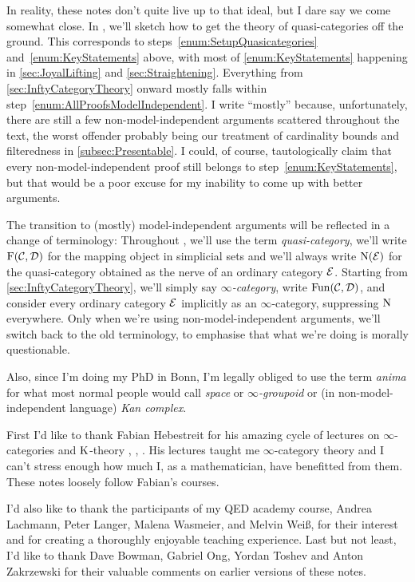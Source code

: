 \documentclass[DIV=12,numbers=enddot,leqno,bibliography=totoc]{scrartcl}
\begin{document}
\begin{numpar}
		In reality, these notes don't quite live up to that ideal, but I dare say we come somewhat close. In , we'll sketch how to get the theory of quasi-categories off the ground. This corresponds to steps~\cref{enum:SetupQuasicategories} and~\cref{enum:KeyStatements} above, with most of \cref{enum:KeyStatements} happening in \cref{sec:JoyalLifting} and \cref{sec:Straightening}. Everything from \cref{sec:InftyCategoryTheory} onward mostly falls within step~\cref{enum:AllProofsModelIndependent}. I write \enquote{mostly} because, unfortunately, there are still a few non-model-independent arguments scattered throughout the text, the worst offender probably being our treatment of cardinality bounds and filteredness in \cref{subsec:Presentable}. I could, of course, tautologically claim that every non-model-independent proof still belongs to step~\cref{enum:KeyStatements}, but that would be a poor excuse for my inability to come up with better arguments.
		
		The transition to (mostly) model-independent arguments will be reflected in a change of terminology: Throughout , we'll use the term  \emph{quasi-category}, we'll write $\operatorname{F}(\mathcal{C},\mathcal{D})$ for the mapping object in simplicial sets and we'll always write $\operatorname{N}(\mathcal{E})$ for the quasi-category obtained as the nerve of an ordinary category $\mathcal{E}$. Starting from \cref{sec:InftyCategoryTheory}, we'll simply say \emph{$\infty$-category}, write $\operatorname{Fun}(\mathcal{C},\mathcal{D})$, and consider every ordinary category $\mathcal{E}$ implicitly as an $\infty$-category, suppressing $\operatorname{N}$ everywhere. Only when we're using non-model-independent arguments, we'll switch back to the old terminology, to emphasise that what we're doing is morally questionable.
		
		Also, since I'm doing my PhD in Bonn, I'm legally obliged to use the term \emph{anima} for what most normal people would call \emph{space} or \emph{$\infty$-groupoid} or (in non-model-independent language) \emph{Kan complex}.
	\end{numpar}
	\begin{numpar}[Acknowledgments.]
		First I'd like to thank Fabian Hebestreit for his amazing cycle of lectures on $\infty$-categories and $\operatorname{K}$-theory \cite{HigherCatsI}, \cite{HigherCatsII}, \cite{KTheory}. His lectures taught me $\infty$-category theory and I can't stress enough how much I, as a mathematician, have benefitted from them. These notes loosely follow Fabian's courses.
		
		I'd also like to thank the participants of my QED academy course, Andrea Lachmann, Peter Langer, Malena Wasmeier, and Melvin Weiß, for their interest and for creating a thoroughly enjoyable teaching experience. Last but not least, I'd like to thank Dave Bowman, Gabriel Ong, Yordan Toshev and Anton Zakrzewski for their valuable comments on earlier versions of these notes.
	\end{numpar}
	
\end{document}
